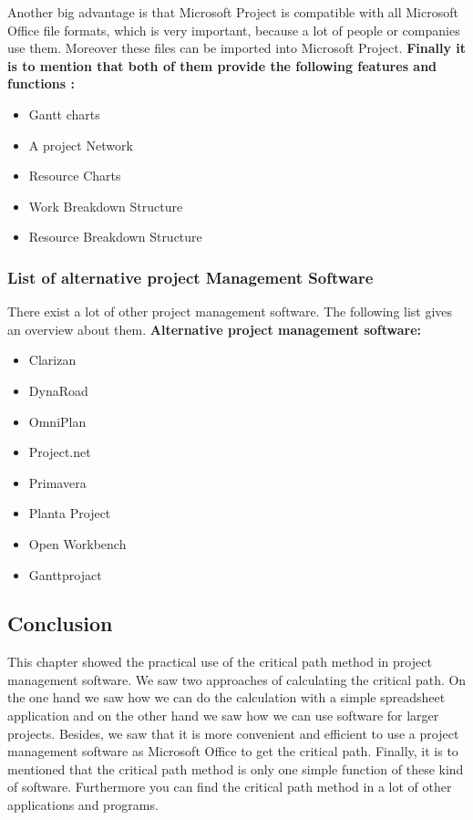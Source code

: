 Another big advantage is that Microsoft Project is compatible with all Microsoft Office file formats, which is very important, because a lot of people or companies use them. Moreover these files can be imported into Microsoft Project.
\newline
\newline
\noindent
\textbf{Finally it is to mention that both of them provide the following features and functions \cite{bright_comparison}:}
\begin{itemize}
\item Gantt charts
\item A project Network
\item Resource Charts
\item Work Breakdown Structure
\item Resource Breakdown Structure
\end{itemize}
\subsubsection{List of alternative project Management Software}
There exist a lot of other project management software. The following list \cite{mspwik} gives an overview about them.
\newline
\newline
\noindent
\textbf{Alternative project management software:} 
\begin{itemize}
\item Clarizan
\item DynaRoad
\item OmniPlan
\item Project.net
\item Primavera
\item Planta Project
\item Open Workbench
\item Ganttprojact
\end{itemize}

\subsection{Conclusion} 
This chapter showed the practical use of the critical path method in project management software. We saw two approaches of calculating the critical path. On the one hand we saw how we can do the calculation with a simple spreadsheet application and on the other hand we saw how we can use software for larger projects. Besides, we saw that it is more convenient and efficient to use a project management software as Microsoft Office to get the critical path. Finally, it is to mentioned that the critical path method is only one simple function of these kind of software. Furthermore you can find the critical path method in a lot of other applications and programs.

